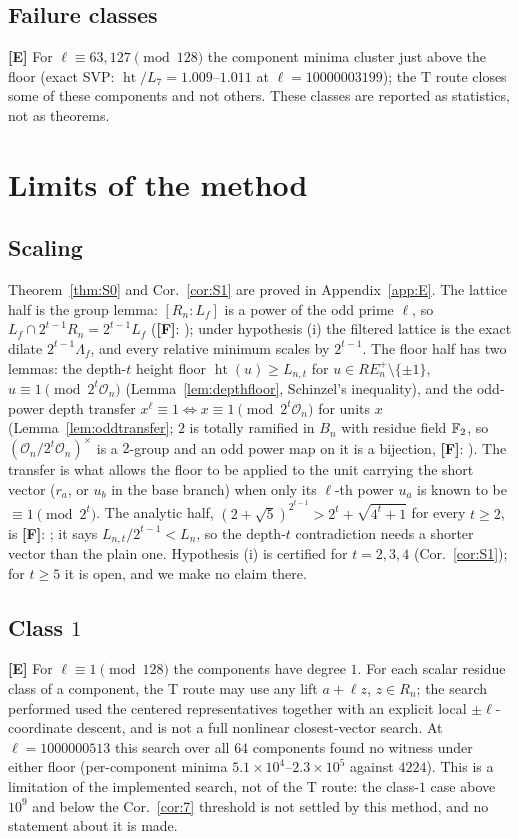 \documentclass[11pt]{amsart}
\theoremstyle{remark}\newtheorem{remark}[theorem]{Remark}
\theoremstyle{definition}\newtheorem{definition}[theorem]{Definition}
\newcommand{\RE}{RE^{+}_n}\newcommand{\ord}{\operatorname{ord}}\newcommand{\hgt}{\operatorname{ht}}
\newcommand{\lbl}[1]{\textbf{[#1]}}\newcommand{\barT}{\bar T_n}
\begin{document}
\subsection{Failure classes} \lbl{E} For $\ell\equiv63,127\pmod{128}$ the component minima cluster just above the floor (exact SVP: $\hgt/L_7=1.009$--$1.011$ at $\ell=10000003199$); the T route closes some of these components and not others. These classes are reported as statistics, not as theorems.

\section{Limits of the method}\label{sec:limits}
\subsection{Scaling}\label{sec:scaling}
Theorem~\ref{thm:S0} and Cor.~\ref{cor:S1} are proved in Appendix~\ref{app:E}. The lattice half is the group lemma: $[R_n:L_f]$ is a power of the odd prime $\ell$, so $L_f\cap2^{t-1}R_n=2^{t-1}L_f$ (\lbl{F}: ); under hypothesis (i) the filtered lattice is the exact dilate $2^{t-1}\Lambda_f$, and every relative minimum scales by $2^{t-1}$. The floor half has two lemmas: the depth-$t$ height floor $\hgt(u)\ge L_{n,t}$ for $u\in\RE\setminus\{\pm1\}$, $u\equiv1\pmod{2^t\mathcal O_n}$ (Lemma~\ref{lem:depthfloor}, Schinzel's inequality), and the odd-power depth transfer $x^\ell\equiv1\iff x\equiv1\pmod{2^t\mathcal O_n}$ for units $x$ (Lemma~\ref{lem:oddtransfer}; $2$ is totally ramified in $B_n$ with residue field $\mathbb{F}_2$, so $(\mathcal O_n/2^t\mathcal O_n)^\times$ is a $2$-group and an odd power map on it is a bijection, \lbl{F}: ). The transfer is what allows the floor to be applied to the unit carrying the short vector ($r_a$, or $u_b$ in the base branch) when only its $\ell$-th power $u_a$ is known to be $\equiv1\pmod{2^t}$. The analytic half, $(2+\sqrt5)^{2^{t-1}}>2^t+\sqrt{4^t+1}$ for every $t\ge2$, is \lbl{F}: ; it says $L_{n,t}/2^{t-1}<L_n$, so the depth-$t$ contradiction needs a shorter vector than the plain one. Hypothesis (i) is certified for $t=2,3,4$ (Cor.~\ref{cor:S1}); for $t\ge5$ it is open, and we make no claim there.
\subsection{Class $1$} \lbl{E} For $\ell\equiv1\pmod{128}$ the components have degree $1$. For each scalar residue class of a component, the T route may use any lift $a+\ell z$, $z\in R_n$; the search performed used the centered representatives together with an explicit local $\pm\ell$-coordinate descent, and is not a full nonlinear closest-vector search. At $\ell=1000000513$ this search over all $64$ components found no witness under either floor (per-component minima $5.1\times10^4$--$2.3\times10^5$ against $4224$). This is a limitation of the implemented search, not of the T route: the class-$1$ case above $10^9$ and below the Cor.~\ref{cor:7} threshold is not settled by this method, and no statement about it is made.
\end{document}
